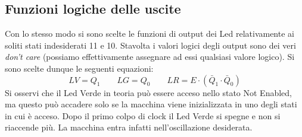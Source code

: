 \documentclass[10pt,a4paper]{article}
\begin{document}
\subsection{Funzioni logiche delle uscite}
Con lo stesso modo si sono scelte le funzioni di output dei Led relativamente ai soliti stati indesiderati 11 e 10. Stavolta i valori logici degli output sono dei veri \emph{don't care} (possiamo effettivamente assegnare ad essi qualsiasi valore logico). Si sono scelte dunque le seguenti equazioni:
\begin{equation}
LV = Q_1\qquad LG = Q_0\qquad LR = E\cdot(\bar{Q}_1\cdot\bar{Q}_0)
\end{equation}
Si osservi che il Led Verde in teoria può essere acceso nello stato Not Enabled, ma questo può accadere solo se la macchina viene inizializzata in uno degli stati in cui è acceso. Dopo il primo colpo di clock il Led Verde si spegne e non si riaccende più. La macchina entra infatti nell'oscillazione desiderata.\\
\end{document}
